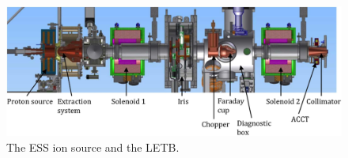 \begin{figure}[!ht]
	\begin{center}
		\includegraphics[width=\textwidth]{02_BeamDiag/figures/fig000_LEBT_ESS}
	\end{center}
	\caption[The ESS ion source and the LETB]{The ESS ion source and the LETB.}
	\label{chap:}
\end{figure}
